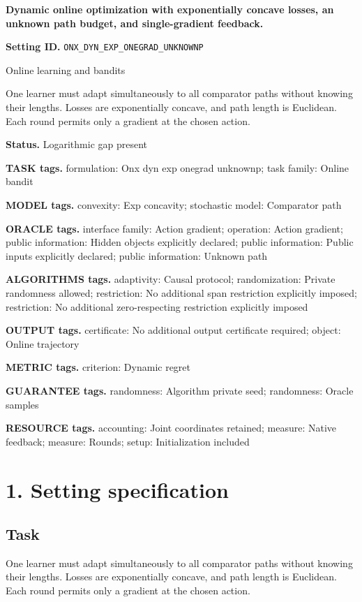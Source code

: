 \documentclass[10pt,a4paper]{article}
\begin{document}
\raggedright

{\LARGE\bfseries\sffamily\color{AtlasNavy} Dynamic online optimization with exponentially concave losses, an unknown path budget, and single-gradient feedback.\par}\vspace{5pt}
\textbf{Setting ID.} \texttt{ONX\_\allowbreak{}DYN\_\allowbreak{}EXP\_\allowbreak{}ONEGRAD\_\allowbreak{}UNKNOWNP}

Online learning and bandits

One learner must adapt simultaneously to all comparator paths without knowing their lengths. Losses are exponentially concave, and path length is Euclidean. Each round permits only a gradient at the chosen action.

\textbf{Status.} Logarithmic gap present

\textbf{TASK tags.} formulation: Onx dyn exp onegrad unknownp; task family: Online bandit

\textbf{MODEL tags.} convexity: Exp concavity; stochastic model: Comparator path

\textbf{ORACLE tags.} interface family: Action gradient; operation: Action gradient; public information: Hidden objects explicitly declared; public information: Public inputs explicitly declared; public information: Unknown path

\textbf{ALGORITHMS tags.} adaptivity: Causal protocol; randomization: Private randomness allowed; restriction: No additional span restriction explicitly imposed; restriction: No additional zero-respecting restriction explicitly imposed

\textbf{OUTPUT tags.} certificate: No additional output certificate required; object: Online trajectory

\textbf{METRIC tags.} criterion: Dynamic regret

\textbf{GUARANTEE tags.} randomness: Algorithm private seed; randomness: Oracle samples

\textbf{RESOURCE tags.} accounting: Joint coordinates retained; measure: Native feedback; measure: Rounds; setup: Initialization included

\section{1. Setting specification}
\subsection{Task}
One learner must adapt simultaneously to all comparator paths without knowing their lengths. Losses are exponentially concave, and path length is Euclidean. Each round permits only a gradient at the chosen action.
\end{document}
